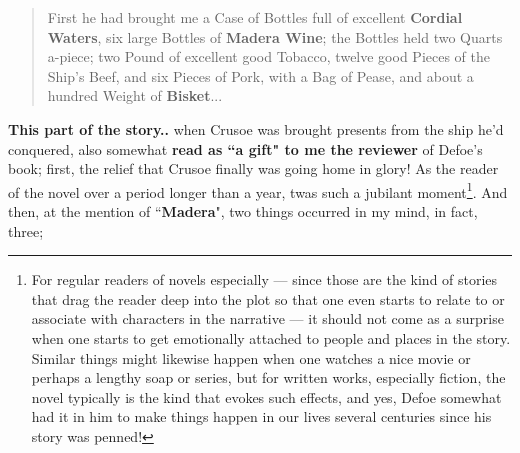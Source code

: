 \documentclass[a4paper]{article}
\begin{document}
\noindent
\begin{minipage}{1\textwidth}
\vspace{1em}
\begin{quotation}
{\ttfamily


First he had brought me a Case of Bottles full of excellent \textbf{Cordial Waters}, six large Bottles of \textbf{Madera Wine}; the Bottles held two Quarts a-piece; two Pound of excellent good Tobacco, twelve good Pieces of the Ship’s Beef, and six Pieces of Pork, with a Bag of Pease, and about a hundred Weight of \textbf{Bisket}...


}
\end{quotation}
\vspace{1em}
\end{minipage}



\textbf{This part of the story..} when Crusoe was brought presents from the ship he'd conquered, also somewhat \textbf{read as ``a gift" to me the reviewer} of Defoe's book; first, the relief that Crusoe finally was going home in glory! As the reader of the novel over a period longer than a year, twas such a jubilant moment\footnote{For regular readers of novels especially --- since those are the kind of stories that drag the reader deep into the plot so that one even starts to relate to or associate with characters in the narrative --- it should not come as a surprise when one starts to get emotionally attached to people and places in the story. Similar things might likewise happen when one watches a nice movie or perhaps a lengthy soap or series, but for written works, especially fiction, the novel typically is the kind that evokes such effects, and yes, Defoe somewhat had it in him to make things happen in our lives several centuries since his story was penned!}. And then, at the mention of ``\textbf{Madera}", two things occurred in my mind, in fact, three; 
\end{document}
